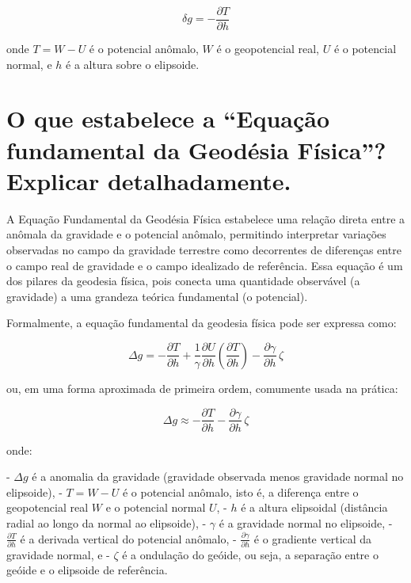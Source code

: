 \[
\delta g = -\frac{\partial T}{\partial h}
\]

onde \( T = W - U \) é o potencial anômalo, \( W \) é o geopotencial real, \( U \) é o potencial normal, e \( h \) é a altura sobre o elipsoide.


\section{O que estabelece a “Equação fundamental da Geodésia Física”? Explicar detalhadamente.}

A Equação Fundamental da Geodésia Física estabelece uma relação direta entre a anômala da gravidade e o potencial anômalo, permitindo interpretar variações observadas no campo da gravidade terrestre como decorrentes de diferenças entre o campo real de gravidade e o campo idealizado de referência. Essa equação é um dos pilares da geodesia física, pois conecta uma quantidade observável (a gravidade) a uma grandeza teórica fundamental (o potencial).

Formalmente, a equação fundamental da geodesia física pode ser expressa como:

\[
\Delta g = -\frac{\partial T}{\partial h} + \frac{1}{\gamma} \frac{\partial U}{\partial h} \left( \frac{\partial T}{\partial h} \right) - \frac{\partial \gamma}{\partial h} \, \zeta
\]

ou, em uma forma aproximada de primeira ordem, comumente usada na prática:

\[
\Delta g \approx -\frac{\partial T}{\partial h} - \frac{\partial \gamma}{\partial h} \, \zeta
\]

onde:

- \( \Delta g \) é a anomalia da gravidade (gravidade observada menos gravidade normal no elipsoide),
- \( T = W - U \) é o potencial anômalo, isto é, a diferença entre o geopotencial real \( W \) e o potencial normal \( U \),
- \( h \) é a altura elipsoidal (distância radial ao longo da normal ao elipsoide),
- \( \gamma \) é a gravidade normal no elipsoide,
- \( \frac{\partial T}{\partial h} \) é a derivada vertical do potencial anômalo,
- \( \frac{\partial \gamma}{\partial h} \) é o gradiente vertical da gravidade normal, e
- \( \zeta \) é a ondulação do geóide, ou seja, a separação entre o geóide e o elipsoide de referência.


